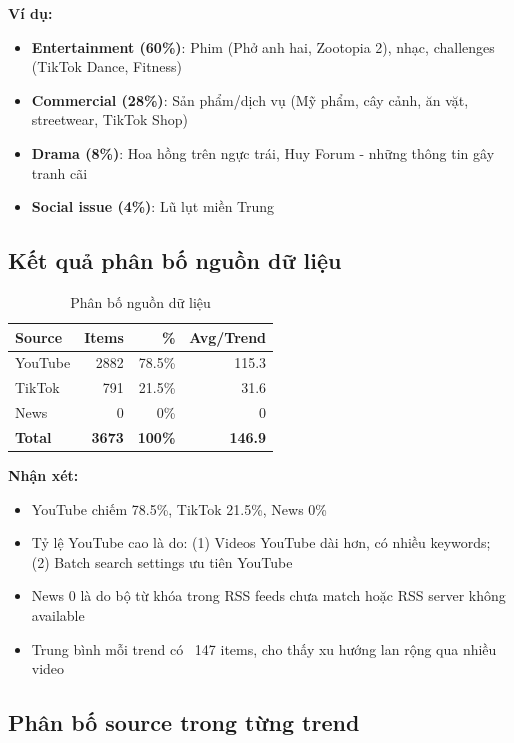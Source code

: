 \textbf{Ví dụ:}
\begin{itemize}
    \item \textbf{Entertainment (60\%)}: Phim (Phở anh hai, Zootopia 2), nhạc, challenges (TikTok Dance, Fitness)
    \item \textbf{Commercial (28\%)}: Sản phẩm/dịch vụ (Mỹ phẩm, cây cảnh, ăn vặt, streetwear, TikTok Shop)
    \item \textbf{Drama (8\%)}: Hoa hồng trên ngực trái, Huy Forum - những thông tin gây tranh cãi
    \item \textbf{Social issue (4\%)}: Lũ lụt miền Trung
\end{itemize}

\subsection{Kết quả phân bố nguồn dữ liệu}

\begin{table}[H]
    \centering
    \begin{tabular}{|l|r|r|r|}
    \hline
    \textbf{Source} & \textbf{Items} & \textbf{\%} & \textbf{Avg/Trend} \\
    \hline
    YouTube & 2882 & 78.5\% & 115.3 \\
    TikTok & 791 & 21.5\% & 31.6 \\
    News & 0 & 0\% & 0 \\
    \hline
    \textbf{Total} & \textbf{3673} & \textbf{100\%} & \textbf{146.9} \\
    \hline
    \end{tabular}
    \caption{Phân bố nguồn dữ liệu}
    \label{table:source_distribution}
\end{table}

\textbf{Nhận xét:}
\begin{itemize}
    \item YouTube chiếm 78.5\%, TikTok 21.5\%, News 0\%
    \item Tỷ lệ YouTube cao là do: (1) Videos YouTube dài hơn, có nhiều keywords; (2) Batch search settings ưu tiên YouTube
    \item News 0 là do bộ từ khóa trong RSS feeds chưa match hoặc RSS server không available
    \item Trung bình mỗi trend có ~147 items, cho thấy xu hướng lan rộng qua nhiều video
\end{itemize}

\subsection{Phân bố source trong từng trend}

